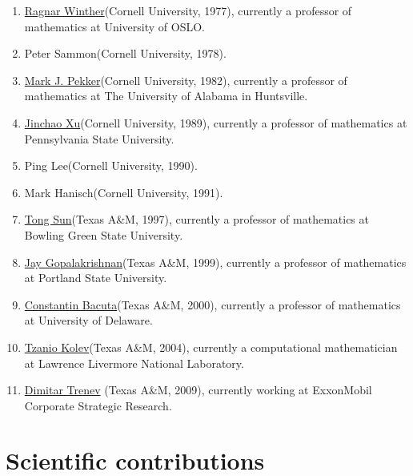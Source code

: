 \documentclass[CJK,11pt]{amsart}
\theoremstyle{definition}
\begin{document}
\begin{CJK*}{UTF8}{gbsn}
\begin{enumerate}
\item \href{https://www.mn.uio.no/math/english/people/aca/rwinther/}{Ragnar Winther}(Cornell University, 1977), currently a professor of mathematics at University of OSLO.
\item Peter Sammon(Cornell University, 1978).
\item \href{https://www.uah.edu/science/departments/math/faculty-staff/mark-pekker}{Mark J. Pekker}(Cornell University, 1982), currently a professor of mathematics at The University of Alabama in Huntsville.
\item \href{https://www.personal.psu.edu/jxx1/}{Jinchao Xu}(Cornell University, 1989), currently a professor of mathematics at Pennsylvania State University. 
\item Ping Lee(Cornell University, 1990).
\item Mark Hanisch(Cornell University, 1991).
\item \href{https://www.bgsu.edu/arts-and-sciences/mathematics-and-statistics/faculty-and-staff/tong-sun.html}{Tong Sun}(Texas A\&M, 1997), currently a professor of mathematics at Bowling Green State University.
\item \href{http://web.pdx.edu/~gjay/}{Jay Gopalakrishnan}(Texas A\&M, 1999), currently a professor of mathematics at Portland State University.
\item \href{http://www.math.udel.edu/~bacuta/}{Constantin Bacuta}(Texas A\&M, 2000), currently a professor of mathematics at University of Delaware.
\item \href{https://people.llnl.gov/kolev1}{Tzanio Kolev}(Texas A\&M, 2004), currently a computational mathematician at Lawrence Livermore National Laboratory.
\item \href{https://scholar.google.com/citations?user=EeWTb_wAAAAJ&hl=en}{Dimitar Trenev} (Texas A\&M, 2009), currently working at ExxonMobil Corporate Strategic Research.
\end{enumerate}


\section{Scientific contributions}



\end{CJK*}
\end{document}
